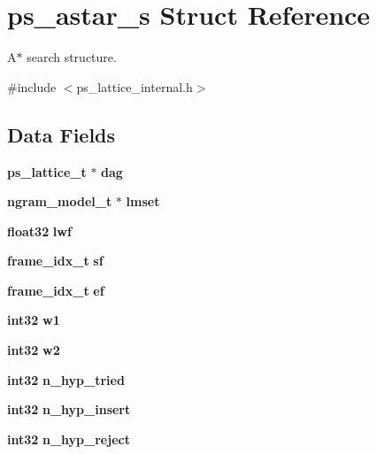 \section{ps\-\_\-astar\-\_\-s \-Struct \-Reference}
\label{structps__astar__s}


\-A$\ast$ search structure.  




{\ttfamily \#include $<$ps\-\_\-lattice\-\_\-internal.\-h$>$}

\subsection*{\-Data \-Fields}
\begin{DoxyCompactItemize}
\item 
{\bf ps\-\_\-lattice\-\_\-t} $\ast$ {\bfseries dag}\label{structps__astar__s_a3c6c2135760c306452e7f5b995091576}

\item 
{\bf ngram\-\_\-model\-\_\-t} $\ast$ {\bfseries lmset}\label{structps__astar__s_a5b7f214f56369c27753e66046fc8ef5c}

\item 
{\bf float32} {\bfseries lwf}\label{structps__astar__s_a9b1624982f8e671404581ac8b372a445}

\item 
{\bf frame\-\_\-idx\-\_\-t} {\bfseries sf}\label{structps__astar__s_a89a18074075a7793803b242bbe8a3028}

\item 
{\bf frame\-\_\-idx\-\_\-t} {\bfseries ef}\label{structps__astar__s_aa2104e1a0a3b369582b5fa920ffa51e6}

\item 
{\bf int32} {\bfseries w1}\label{structps__astar__s_ad1ada6d9fe189e9f7c028ade731967b2}

\item 
{\bf int32} {\bfseries w2}\label{structps__astar__s_aa3fcb0733516a2740086969c4b4c88e4}

\item 
{\bf int32} {\bfseries n\-\_\-hyp\-\_\-tried}\label{structps__astar__s_ad8eb709a4df4d04112578b3cb390e1c5}

\item 
{\bf int32} {\bfseries n\-\_\-hyp\-\_\-insert}\label{structps__astar__s_abd46619036fe6ff13ca9d2ca5b76512b}

\item 
{\bf int32} {\bfseries n\-\_\-hyp\-\_\-reject}\label{structps__astar__s_a3de51b20d960b50aec4d908af5e43787}


\end{DoxyCompactItemize}
